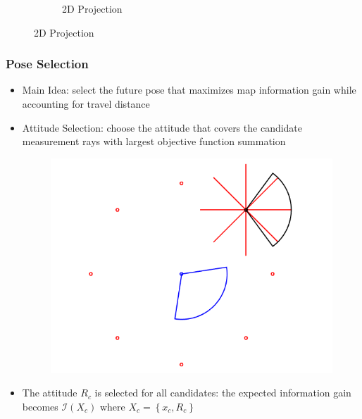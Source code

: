 \documentclass[11pt,professionalfonts,hyperref={pdftex,pdfpagemode=none,pdfstartview=FitH}]{beamer}
\newcommand{\braces}[1]{\ensuremath{\left\{ #1 \right\}}}
\begin{document}
\begin{frame}
\begin{itemize}
\begin{itemize}
\begin{figure}
\begin{subfigure}[t]{.3\linewidth}
    \caption*{2D Projection}
  \end{subfigure}
\end{figure}
	\end{itemize}
\end{itemize}

\end{frame}

\begin{frame}
\frametitle{Pose Selection}

\begin{itemize}
	\item Main Idea: select the future pose that maximizes map information gain while accounting for travel distance
	\vspace*{0.0cm}\pause
	\item Attitude Selection: choose the attitude that covers the candidate measurement rays with largest objective function summation
\begin{figure}
\centerline{
	\includegraphics[height=0.35\linewidth]{ExampleOptimalPose.png}
}
\vspace*{-0.05\linewidth}
\end{figure}
	\item The attitude $R_c$ is selected for all candidates: the expected information gain becomes $\mathcal I(X_c)$ where $X_c=\braces{x_c,R_c}$
\end{itemize}

\end{frame}
\end{document}
